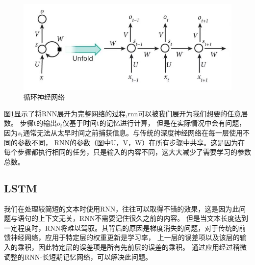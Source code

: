 \begin{figure}[htbp]
  \centering
  \includegraphics[scale=0.5]{./images/rnn.jpg}
  \caption{循环神经网络}
  \label{fig:rnn}
\end{figure}

图\ref{fig:rnn}显示了将RNN展开为完整网络的过程,rnn可以被我们展开为我们想要的任意层数。
步骤t的输出$o_{t}$仅基于时间t的记忆进行计算，
  但是在实际情况中会有问题，因为$s_{t}$通常无法从太早时间之前捕获信息。与传统的深度神经网络在每一层使用不同的参数不同，
  RNN的参数（图中U，V，W）在所有步骤中共享。这是因为在每个步骤都执行相同的任务，只是输入的内容不同，这大大减少了需要学习的参数总数。



  

\subsection{LSTM}
  我们在处理较简短的文本时使用RNN，往往可以取得不错的效果，这是因为此问题与语句的上下文无关，RNN不需要记住很久之前的内容。
  但是当文本长度达到一定程度时，RNN将难以驾驭。其背后的原因是梯度消失的问题，对于传统的前馈神经网络，应用于特定层的权重更新是学习率，
  上一层的误差项以及该层的输入的乘积，因此特定层的误差项是所有先前层的误差的乘积。
  通过应用经过稍微调整的RNN-长短期记忆网络，可以解决此问题。

